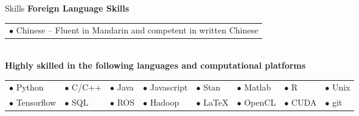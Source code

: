 \documentclass{resume} %
\begin{document}
\begin{rSection}{Skills}
  \textbf{Foreign Language Skills}\\
  \begin{tabular}{l}
    $\bullet$ Chinese --  Fluent in Mandarin and competent in written Chinese\\
  \end{tabular}\\
  \textbf{Highly skilled in the following languages and computational platforms}\\
  \begin{tabular}{llllllll}
     $\bullet$ Python   &  $\bullet$ C/C++ &  $\bullet$ Java  & $\bullet$ Javascript & $\bullet$ Stan & $\bullet$ Matlab   &  $\bullet$ R     &  $\bullet$ Unix \\
     $\bullet$ Tensorflow & $\bullet$ SQL & $\bullet$ ROS &  $\bullet$ Hadoop &  $\bullet$ \LaTeX &  $\bullet$ OpenCL   &  $\bullet$ CUDA   &   $\bullet$ git\\
  \end{tabular}
\end{rSection}
\end{document}
